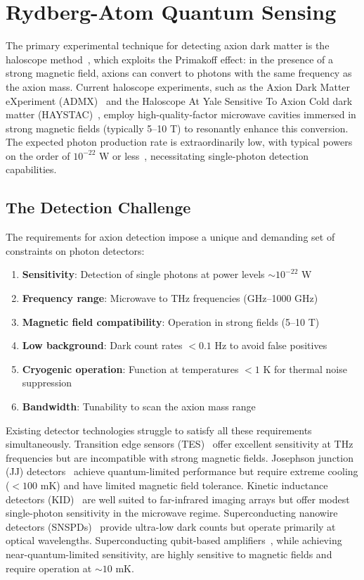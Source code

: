 \section{Rydberg-Atom Quantum Sensing}

The primary experimental technique for detecting axion dark matter is the haloscope method~\cite{Sikivie1983, Sikivie2021}, which exploits the Primakoff effect: in the presence of a strong magnetic field, axions can convert to photons with the same frequency as the axion mass. Current haloscope experiments, such as the Axion Dark Matter eXperiment (ADMX)~\cite{Backes2021} and the Haloscope At Yale Sensitive To Axion Cold dark matter (HAYSTAC)~\cite{Zhong2018}, employ high-quality-factor microwave cavities immersed in strong magnetic fields (typically 5--10 T) to resonantly enhance this conversion. The expected photon production rate is extraordinarily low, with typical powers on the order of $10^{-22}$ W or less~\cite{Sikivie2021,Graham2015}, necessitating single-photon detection capabilities.

\subsection*{The Detection Challenge}

The requirements for axion detection impose a unique and demanding set of constraints on photon detectors:

\begin{enumerate}
    \item \textbf{Sensitivity}: Detection of single photons at power levels $\sim 10^{-22}$ W
    \item \textbf{Frequency range}: Microwave to THz frequencies (GHz--1000 GHz)
    \item \textbf{Magnetic field compatibility}: Operation in strong fields (5--10 T)
    \item \textbf{Low background}: Dark count rates $< 0.1$ Hz to avoid false positives
    \item \textbf{Cryogenic operation}: Function at temperatures $< 1$ K for thermal noise suppression
    \item \textbf{Bandwidth}: Tunability to scan the axion mass range
\end{enumerate}

Existing detector technologies struggle to satisfy all these requirements simultaneously. Transition edge sensors (TES)~\cite{Guo2017} offer excellent sensitivity at THz frequencies but are incompatible with strong magnetic fields. Josephson junction (JJ) detectors~\cite{Pankratov2022} achieve quantum-limited performance but require extreme cooling ($< 100$ mK) and have limited magnetic field tolerance. Kinetic inductance detectors (KID)~\cite{Guo2017} are well suited to far-infrared imaging arrays but offer modest single-photon sensitivity in the microwave regime. Superconducting nanowire detectors (SNSPDs)~\cite{Chiles2019} provide ultra-low dark counts but operate primarily at optical wavelengths. Superconducting qubit-based amplifiers~\cite{Backes2021}, while achieving near-quantum-limited sensitivity, are highly sensitive to magnetic fields and require operation at $\sim 10$ mK.


